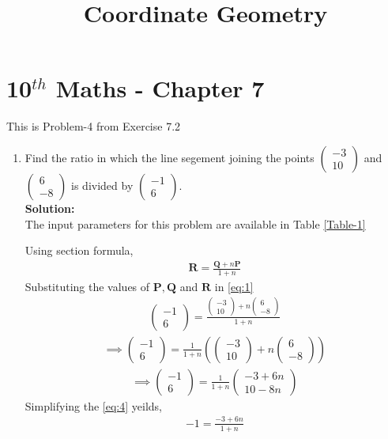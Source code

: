 \documentclass[12pt]{article}
\providecommand{\brak}[1]{\ensuremath{\left(#1\right)}}
\newcommand{\solution}{\noindent \textbf{Solution: }}
\newcommand{\myvec}[1]{\ensuremath{\begin{pmatrix}#1\end{pmatrix}}}
\let\vec\mathbf
\begin{document}
\begin{center}
\title{\textbf{Coordinate Geometry}}
\date{\vspace{-5ex}} %
\maketitle
\end{center}
\setcounter{page}{1}
\section*{10$^{th}$ Maths - Chapter 7}
This is Problem-4 from Exercise 7.2
\begin{enumerate}
\item Find the ratio in which the line segement joining the points $\myvec{-3 \\ 10}$ and $\myvec{6\\-8}$ is divided by $\myvec{-1\\6}$.\\
\solution \\The input parameters for this problem are available in Table \eqref{Table-1}
\begin{table}[ht!]

\caption{}
\label{Table-1} 
\end{table}
Using section formula,
\begin{align}
         \vec{R}=\frac{\vec{Q}+n\vec{P}}{1+n}\label{eq:1}
\end{align}
Substituting the values of $\vec{P},\vec{Q}$ and $\vec{R}$ in \eqref{eq:1}
\begin{align}
         \myvec{-1\\6}=\frac{{\myvec{-3\\10}+n\myvec{6\\-8}}}{1+n}
\end{align}
\begin{align}
         \implies \myvec{-1\\6}=\frac{1}{1+n}\brak{{\myvec{-3\\10}+n\myvec{6\\-8}}} 
         \end{align}
\begin{align}
         \implies \myvec{-1\\6}=\frac{1}{1+n}\myvec{-3+6n\\10-8n} \label{eq:4}
\end{align}
Simplifying the \eqref{eq:4} yeilds,
\begin{align}
          -1 = \frac{-3+6n}{1+n}\\

\end{align}
\end{enumerate}
\end{document}
